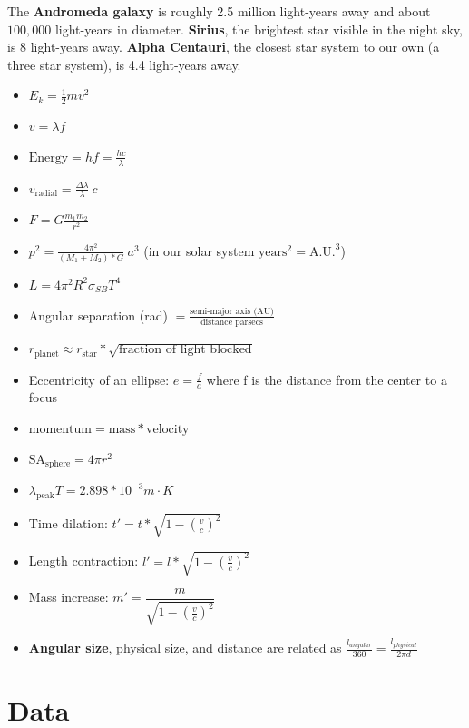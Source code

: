 \documentclass[12pt]{article}
\begin{document}
The {\bf Andromeda galaxy} is roughly 2.5 million light-years away and about $100,000$ light-years in diameter. {\bf Sirius}, the brightest star visible in the night sky, is 8 light-years away. {\bf Alpha Centauri}, the closest star system to our own (a three star system), is 4.4 light-years away.

\begin{itemize}
    \item $E_k = \frac{1}{2}mv^2$
    \item $v = \lambda f$
    \item $\text{Energy} = h f = \frac{hc}{\lambda}$
    \item $v_\text{radial} = \frac{\Delta \lambda}{\lambda}\ c$
    \item $F = G\frac{m_1 m_2}{r^2}$
    \item $p^2 = \frac{4\pi^2}{(M_1 + M_2) * G}\ a^3$ (in our solar system $\text{years}^2 = \text{A.U.}^3$)
    \item $L = 4\pi^2R^2 \sigma_{SB} T^4$
    \item Angular separation (rad) $= \frac{\text{semi-major axis (AU)}}{\text{distance parsecs}}$
    \item $r_\text{planet} \approx r_\text{star} * \sqrt{\text{fraction of light blocked}}$
    \item Eccentricity of an ellipse: $e = \frac{f}{a}$ where f is the distance from the center to a focus
    \item $\text{momentum} = \text{mass} * \text{velocity}$
    \item $\text{SA}_\text{sphere} = 4 \pi r^2$
    \item $\lambda_\text{peak} T = 2.898 * 10^{-3} m \cdot K$
    \item Time dilation: $t' = t * \sqrt{1 - \left( \frac{v}{c} \right)^2}$
    \item Length contraction: $l' = l * \sqrt{1 - \left( \frac{v}{c} \right)^2}$
    \item Mass increase: $m' = \dfrac{m}{\sqrt{1 - \left( \frac{v}{c} \right)^2}}$
    \item {\bf Angular size}, physical size, and distance are related as $\frac{l_{angular}}{360} = \frac{l_{physical}}{2\pi d}$
\end{itemize}

\section{Data}
\end{document}
